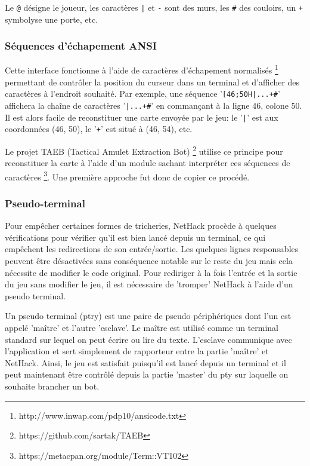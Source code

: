 \documentclass{article}
\begin{document}
Le \verb!@! désigne le joueur, les caractères \verb!|! et \verb!-! sont des murs, les \verb!#! des couloirs, un \verb!+! symbolyse une porte, etc.


\subsubsection*{Séquences d'échapement ANSI}

Cette interface fonctionne à l'aide de caractères d'échapement normalisés \footnote{http://www.inwap.com/pdp10/ansicode.txt} permettant de contrôler la position du curseur dans un terminal et d'afficher des caractères à l'endroit souhaité. Par exemple, une séquence '\verb![46;50H|...+#!' affichera la chaîne de caractères '\verb!|...+#!' en commançant à la ligne 46, colone 50. Il est alors facile de reconstituer une carte envoyée par le jeu: le '\verb!|!' est aux coordonnées (46, 50), le '\verb!+!' est situé à (46, 54), etc.
	
	Le projet TAEB (Tactical Amulet Extraction Bot) \footnote{https://github.com/sartak/TAEB} utilise ce principe pour reconstituer la carte à l'aide d'un module sachant interpréter ces séquences de caractères \footnote{https://metacpan.org/module/Term::VT102}. Une première approche fut donc de copier ce procédé.

\subsubsection*{Pseudo-terminal}

Pour empêcher certaines formes de tricheries, NetHack procède à quelques vérifications pour vérifier qu'il est bien lancé depuis un terminal, ce qui empêchent les redirections de son entrée/sortie. Les quelques lignes responsables peuvent être désactivées sans conséquence notable sur le reste du jeu mais cela nécessite de modifier le code original. Pour rediriger à la fois l'entrée et la sortie du jeu sans modifier le jeu, il est nécessaire de 'tromper' NetHack à l'aide d'un pseudo terminal.

Un pseudo terminal (ptry) est une paire de pseudo périphériques dont l'un est appelé 'maître' et l'autre 'esclave'. Le maître est utilisé comme un terminal standard sur lequel on peut écrire ou lire du texte. L'esclave communique avec l'application et sert simplement de rapporteur entre la partie 'maître' et NetHack. Ainsi, le jeu est satisfait puisqu'il est lancé depuis un terminal et il peut maintenant être contrôlé depuis la partie 'master' du pty sur laquelle on souhaite brancher un bot.
\end{document}
